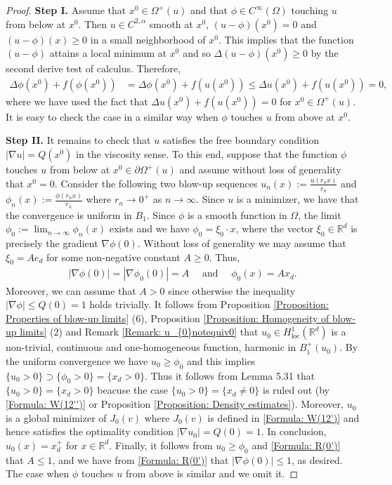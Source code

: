 \documentclass[11pt,reqno]{amsart}
\begin{document}
\begin{proof}
	\textbf{Step I.} Assume that $x^{0}\in\varOmega^{+}(u)$ and that $\phi\in C^{\infty}(\Omega)$ touching $u$ from below at $x^{0}$. Then $u\in C^{2,\alpha}$ smooth at $x^{0}$, $(u-\phi)(x^{0})=0$ and $(u-\phi)(x)\geqslant0$ in a small neighborhood of $x^{0}$. This implies that the function $(u-\phi)$ attains a local minimum at $x^{0}$ and so $\Delta(u-\phi)(x^{0})\geqslant0$ by the second derive test of calculus. Therefore,
	\begin{align*}
		\Delta\phi(x^{0})+f(\phi(x^{0}))&=\Delta\phi(x^{0})+f(u(x^{0}))\leqslant\Delta u(x^{0})+f(u(x^{0}))=0,
	\end{align*}
    where we have used the fact that $\Delta u(x^{0})+f(u(x^{0}))=0$ for $x^{0}\in\varOmega^{+}(u)$. It is easy to check the case in a similar way when $\phi$ touches $u$ from above at $x^{0}$.
    
    \textbf{Step II.} It remains to check that $u$ satisfies the free boundary condition $|\nabla u|=Q(x^{0})$ in the viscosity sense. To this end, suppose that the function $\phi$ touches $u$ from below at  $x^{0}\in\partial\varOmega^{+}(u)$ and assume without loss of generality that $x^{0}=0$. Consider the following two blow-up sequences $u_{n}(x):=\frac{u(r_{n}x)}{r_{n}}$ and $\phi_{n}(x):=\frac{\phi(r_{n}x)}{r_{n}}$ where $r_{n}\to0^{+}$ as $n\to\infty$. Since $u$ is a minimizer, we have that the convergence is uniform in $B_{1}$. Since $\phi$ is a smooth function in $\Omega$, the limit $\phi_{0}:=\lim_{n\to\infty}\phi_{n}(x)$ exists and we have $\phi_{0}=\xi_{0}\cdot x$, where the vector $\xi_{0}\in\mathbb{R}^{d}$ is precisely the gradient $\nabla\phi(0)$. Without loss of generality we may assume that $\xi_{0}=Ae_{d}$ for some non-negative constant $A\geqslant0$. Thus,
    \begin{align}\label{Formula: R(0')}
    	|\nabla\phi(0)|=|\nabla\phi_{0}(0)|=A\quad\text{ and }\quad\phi_{0}(x)=Ax_{d}.
    \end{align}
    Moreover, we can assume that $A>0$ since otherwise the inequality $|\nabla\phi|\leqslant Q(0)=1$ holds trivially. It follows from Proposition \ref{Proposition: Properties of blow-up limits} (6), Proposition \ref{Proposition: Homogeneity of blow-up limits} (2) and Remark \ref{Remark: u_{0}notequiv0} that $u_{0}\in H_{\mathrm{loc}}^{1}(\mathbb{R}^{d})$ is a non-trivial, continuous and one-homogeneous function, harmonic in $B_{1}^{+}(u_{0})$. By the uniform convergence we have  $u_{0}\geqslant\phi_{0}$ and this implies $\{u_{0}>0\}\supset\{\phi_{0}>0\}=\{x_{d}>0\}$. Thus it follows from Lemma 5.31 \cite{RTV2019} that $\{u_{0}>0\}=\{x_{d}>0\}$ beacuse the case $\{u_{0}>0\}=\{x_{d}\neq0\}$ is ruled out (by \eqref{Formula: W(12'')} or Proposition \ref{Proposition: Density estimates}). Moreover, $u_{0}$ is a global minimizer of $J_{0}(v)$ where $J_{0}(v)$ is defined in \eqref{Formula: W(12')} and hence satisfies the optimality condition $|\nabla u_{0}|=Q(0)=1$. In conclusion, $u_{0}(x)=x_{d}^{+}$ for $x\in\mathbb{R}^{d}$. Finally, it follows from $u_{0}\geqslant\phi_{0}$ and \eqref{Formula: R(0')} that $A\leqslant1$, and we have from \eqref{Formula: R(0')} that $|\nabla\phi(0)|\leqslant1$, as desired. The case when $\phi$ touches $u$ from above is similar and we omit it.
\end{proof}
\end{document}
